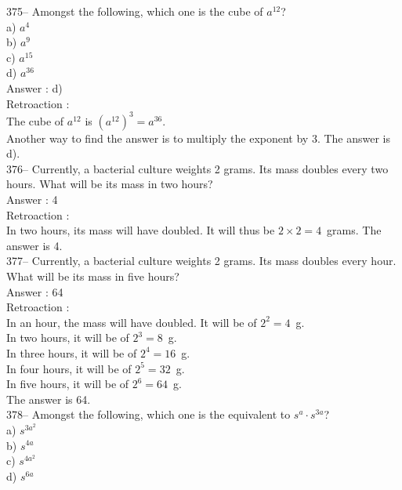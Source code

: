 ﻿\documentclass[letterpaper, 12pt]{article}
\begin{document}
375-- Amongst the following, which one is the cube of $a^{12}$?\\
a) $a^{4}$\\
b) $a^{9}$\\
c) $a^{15}$\\
d) $a^{36}$\\

Answer : d) \\

Retroaction : \\
The cube of $a^{12}$ is $\left( a^{12}\right)^{3}=a^{36}$.  \\
Another way to find the answer is to multiply the exponent by 3.
The answer is d).\\

376-- Currently, a bacterial culture weights 2 grams.
Its mass doubles every two hours. What will be its mass in two hours?\\

Answer : 4\\

Retroaction : \\
In two hours, its mass will have doubled. It will thus be $2\times
2=4$~grams.  The answer is 4.\\

377-- Currently, a bacterial culture weights 2 grams.
Its mass doubles every hour. What will be its mass in five hours?\\

Answer : 64\\

Retroaction : \\
In an hour, the mass will have doubled. It will be of $2^{2}=4$~g.\\
In two hours, it will be of $2^{3}=8$~g.\\
In three hours, it will be of $2^{4}=16$~g.\\
In four hours, it will be of $2^{5}=32$~g.\\
In five hours, it will be of $2^{6}=64$~g.\\
The answer is 64.\\

378-- Amongst the following, which one is the equivalent to
$s^{a}\cdot s^{3a}$?\\
a) $s^{3a^{2}}$\\
b) $s^{4a}$\\
c) $s^{4a^{2}}$\\
d) $s^{6a}$\\
\end{document}
